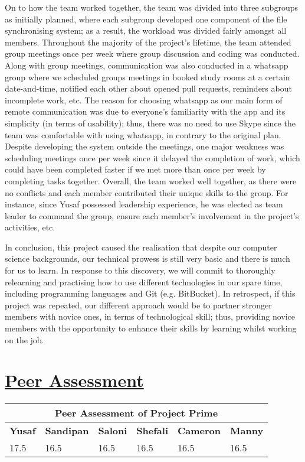 \documentclass{article}
\begin{document}
\noindent On to how the team worked together, the team was divided into three subgroups as initially planned, where each subgroup developed one component of the file synchronising system; as a result, the workload was divided fairly amongst all members. Throughout the majority of the project's lifetime, the team attended group meetings once per week where group discussion and coding was conducted. Along with group meetings, communication was also conducted in a whatsapp group where we scheduled groups meetings in booked study rooms at a certain date-and-time, notified each other about opened pull requests, reminders about incomplete work, etc. The reason for choosing whatsapp as our main form of remote communication was due to everyone's familiarity with the app and its simplicity (in terms of usability); thus, there was no need to use Skype since the team was comfortable with using whatsapp, in contrary to the original plan. Despite developing the system outside the meetings, one major weakness was scheduling meetings once per week since it delayed the completion of work, which could have been completed faster if we met more than once per week by completing tasks together. Overall, the team worked well together, as there were no conflicts and each member contributed their unique  skills to the group. For instance, since Yusaf possessed leadership experience, he was elected as team leader to command the group, ensure each member's involvement in the project's activities, etc.

\noindent In conclusion, this project caused the realisation that despite our computer science backgrounds, our technical prowess is still very basic and there is much for us to learn. In response to this discovery, we will commit to thoroughly relearning and practising how to use different technologies in our spare time, including programming languages and Git (e.g. BitBucket). In retrospect, if this project was repeated, our different approach would be to partner stronger members with novice ones, in terms of technological skill; thus, providing novice members with the opportunity to enhance their skills by learning whilst working on the job.   

\section{\underline{Peer Assessment}}
\begin{tabular}{|p{1.5cm}|p{1.5cm}|p{1.5cm}|p{1.5cm}|p{1.5cm}|p{1.5cm}|}
\hline
\multicolumn{6}{|c|}{\textbf{Peer Assessment of Project Prime}} \\
\hline
\textbf{Yusaf} & \textbf{Sandipan} & \textbf{Saloni} & \textbf{Shefali} & \textbf{Cameron} & \textbf{Manny} \\
\hline
17.5 & 16.5 & 16.5 & 16.5 & 16.5 & 16.5 \\
\hline
\end{tabular}
	
\end{document}
